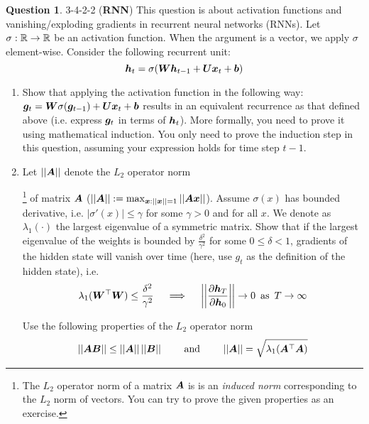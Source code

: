 \documentclass[12pt]{article}
\theoremstyle{definition}
\newtheorem{exercise}{Question}%
\newcommand{\staritem}{
\addtocounter{enumi}{1}
\item[$\phantom{x}^{*}$\theenumi]}
\begin{document}
\begin{exercise} 3-4-2-2 (\textbf{RNN})
    \label{ex:rnn_spectral}
    This question is about activation functions and vanishing/exploding gradients in recurrent neural networks (RNNs). Let $\sigma:\mathbb{R}\rightarrow\mathbb{R}$ be an activation function. 
    When the argument is a vector, we apply $\sigma$ element-wise. 
    Consider the following recurrent unit:
    $${\bm{h}}_t = \sigma({\bm{W}} {\bm{h}}_{t-1} + {\bm{U}}{\bm{x}}_t + {\bm{b}})$$
    \begin{enumerate}[label=\arabic{exercise}.\arabic*]
        \item Show that applying the activation function in the following way: ${\bm{g}}_t = {\bm{W}}\sigma({\bm{g}}_{t-1}) + {\bm{U}}{\bm{x}}_t + {\bm{b}}$ results  in an equivalent recurrence as that defined above (i.e. express ${\bm{g}}_t$ in terms of ${\bm{h}}_t$).
        More formally, you need to prove it using mathematical induction. 
        You only need to prove the induction step in this question, assuming your expression holds for time step $t-1$.
        \item
        Let $||{\bm{A}}||$ denote the $L_2$ operator norm
        
        \footnote{
        The $L_2$ operator norm of a matrix ${\bm{A}}$ is is an \textit{induced norm} corresponding to the $L_2$ norm of vectors. 
        You can try to prove the given properties as an exercise.
        }
        of matrix ${\bm{A}}$ ($||{\bm{A}}||:=\max_{{\bm{x}}:||{\bm{x}}||=1}||{\bm{A}}{\bm{x}}||$). 
        Assume $\sigma(x)$ has bounded derivative, i.e. $|\sigma'(x)|\leq \gamma$ for some $\gamma>0$ and for all $x$. We denote as $\lambda_1(\cdot)$ the largest eigenvalue of a symmetric matrix. Show that if the largest eigenvalue of the weights is bounded by $\frac{\delta^2}{\gamma^2}$ for some $0 \leq \delta < 1$, gradients of the hidden state will vanish over time (here, use $g_t$ as the definition of the hidden state),    
         i.e.  
        $$\lambda_1({\bm{W}}^\top{\bm{W}})\leq\frac{\delta^2}{\gamma^2} \quad\implies\quad \bigg{|}\bigg{|}\frac{\partial{\bm{h}}_T}{\partial{\bm{h}}_0}\bigg{|}\bigg{|}  \rightarrow0 \,\text{ as }\,T\rightarrow\infty$$
        
        Use the following properties of the $L_2$ operator norm 
        $$||{\bm{A}}{\bm{B}}||\leq||{\bm{A}}||\,||{\bm{B}}|| \qquad \text{ and } \qquad ||{\bm{A}}||=\sqrt{\lambda_1({\bm{A}}^\top{\bm{A}})}$$
        

\end{enumerate}
\end{exercise}
\end{document}
